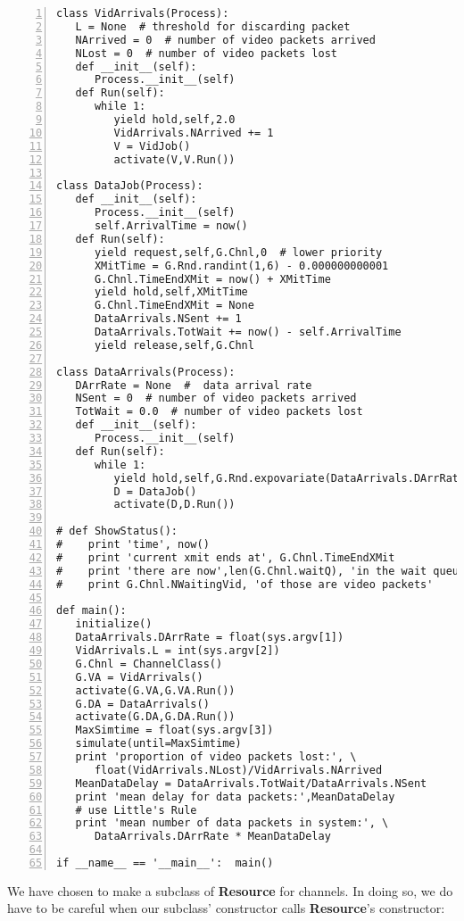 \documentclass[11pt]{article}
\begin{document}
\begin{Verbatim}[fontsize=\relsize{-2},numbers=left]
class VidArrivals(Process):
   L = None  # threshold for discarding packet
   NArrived = 0  # number of video packets arrived
   NLost = 0  # number of video packets lost
   def __init__(self):
      Process.__init__(self)  
   def Run(self):
      while 1:
         yield hold,self,2.0
         VidArrivals.NArrived += 1
         V = VidJob()
         activate(V,V.Run())

class DataJob(Process):
   def __init__(self):
      Process.__init__(self)  
      self.ArrivalTime = now()
   def Run(self):
      yield request,self,G.Chnl,0  # lower priority
      XMitTime = G.Rnd.randint(1,6) - 0.000000000001
      G.Chnl.TimeEndXMit = now() + XMitTime
      yield hold,self,XMitTime
      G.Chnl.TimeEndXMit = None
      DataArrivals.NSent += 1
      DataArrivals.TotWait += now() - self.ArrivalTime
      yield release,self,G.Chnl

class DataArrivals(Process):
   DArrRate = None  #  data arrival rate
   NSent = 0  # number of video packets arrived
   TotWait = 0.0  # number of video packets lost
   def __init__(self):
      Process.__init__(self)  
   def Run(self):
      while 1:
         yield hold,self,G.Rnd.expovariate(DataArrivals.DArrRate)
         D = DataJob()
         activate(D,D.Run()) 

# def ShowStatus():
#    print 'time', now()
#    print 'current xmit ends at', G.Chnl.TimeEndXMit
#    print 'there are now',len(G.Chnl.waitQ), 'in the wait queue'
#    print G.Chnl.NWaitingVid, 'of those are video packets'

def main():
   initialize()  
   DataArrivals.DArrRate = float(sys.argv[1])
   VidArrivals.L = int(sys.argv[2])
   G.Chnl = ChannelClass()
   G.VA = VidArrivals()
   activate(G.VA,G.VA.Run())
   G.DA = DataArrivals()
   activate(G.DA,G.DA.Run())
   MaxSimtime = float(sys.argv[3])
   simulate(until=MaxSimtime)
   print 'proportion of video packets lost:', \
      float(VidArrivals.NLost)/VidArrivals.NArrived
   MeanDataDelay = DataArrivals.TotWait/DataArrivals.NSent
   print 'mean delay for data packets:',MeanDataDelay
   # use Little's Rule
   print 'mean number of data packets in system:', \
      DataArrivals.DArrRate * MeanDataDelay

if __name__ == '__main__':  main()
\end{Verbatim}

We have chosen to make a subclass of {\bf Resource} for channels.  In
doing so, we do have to be careful when our subclass' constructor calls
{\bf Resource}'s constructor:
\end{document}
